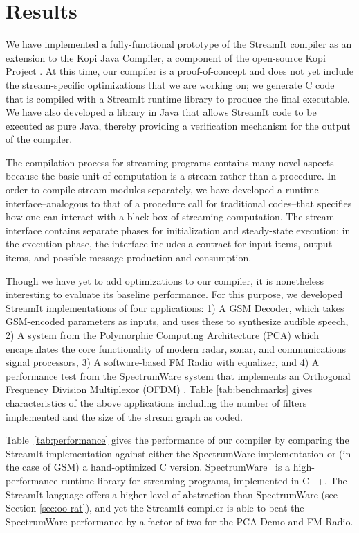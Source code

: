 \section{Results}
\label{sec:results}

We have implemented a fully-functional prototype of the StreamIt
compiler as an extension to the Kopi Java Compiler, a component of the
open-source Kopi Project \cite{kopi}.  At this time, our compiler is a
proof-of-concept and does not yet include the stream-specific
optimizations that we are working on; we generate C code that is
compiled with a StreamIt runtime library to produce the final
executable.  We have also developed a library in Java that allows
StreamIt code to be executed as pure Java, thereby providing a
verification mechanism for the output of the compiler.

The compilation process for streaming programs contains many novel
aspects because the basic unit of computation is a stream rather than a
procedure.  In order to compile stream modules separately, we have
developed a runtime interface--analogous to that of a procedure call for
traditional codes--that specifies how one can interact with a black box
of streaming computation.  The stream interface contains separate phases
for initialization and steady-state execution; in the execution phase,
the interface includes a contract for input items, output items, and
possible message production and consumption.

Though we have yet to add optimizations to our compiler, it is
nonetheless interesting to evaluate its baseline performance.  For this
purpose, we developed StreamIt implementations of four applications: 1)
A GSM Decoder, which takes GSM-encoded parameters as inputs, and uses
these to synthesize audible speech\cite{gsm}, 2) A system from the
Polymorphic Computing Architecture (PCA) \cite{pca} which encapsulates
the core functionality of modern radar, sonar, and communications signal
processors, 3) A software-based FM Radio with equalizer, and 4) A
performance test from the SpectrumWare system that implements an
Orthogonal Frequency Division Multiplexor (OFDM)
\cite{spectrumware}.  Table \ref{tab:benchmarks} gives characteristics
of the above applications including the number of filters implemented
and the size of the stream graph as coded.

Table~\ref{tab:performance} gives the performance of our compiler by
comparing the StreamIt implementation against either the SpectrumWare
implementation or (in the case of GSM) a hand-optimized C version.
SpectrumWare \cite{spectrumware}~is a high-performance runtime library
for streaming programs, implemented in C++.  The StreamIt language
offers a higher level of abstraction than SpectrumWare (see Section
\ref{sec:oo-rat}), and yet the StreamIt compiler is able to beat the
SpectrumWare performance by a factor of two for the PCA Demo and FM
Radio.

